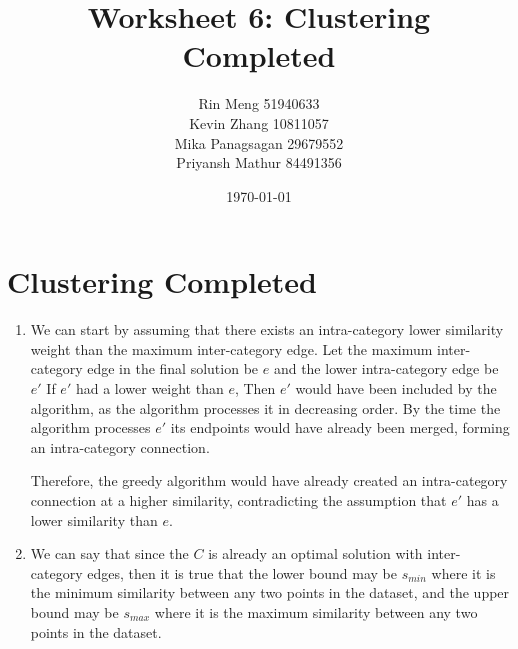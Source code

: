 \documentclass[12pt]{article}
\title{Worksheet 6: Clustering Completed}
\author{Rin Meng 51940633 \\ Kevin Zhang 10811057 \\ Mika Panagsagan 29679552 \\ Priyansh Mathur 84491356}
\date{\today}
\begin{document}
\maketitle

\section{Clustering Completed}

\begin{enumerate}
    \item We can start by assuming that there exists an intra-category
    lower similarity weight than the maximum inter-category edge. 
    Let the maximum inter-category edge in the final solution be $e$ 
    and the lower intra-category edge be $e \prime$
    If $e \prime$ had a lower weight than $e$,
    Then $e \prime$ would have been included by the algorithm, as 
    the algorithm processes it in decreasing order.
    By the time the algorithm processes $e \prime$ its endpoints would have already
    been merged, forming an intra-category connection.

    Therefore, the greedy algorithm would have already created an 
    intra-category connection at a higher similarity, 
    contradicting the assumption that $e \prime$ has a lower similarity than $e$.

    \item We can say that since the $C$ is already an optimal solution with inter-category
    edges, then it is true that the lower bound may be $s_{min}$ where it is the minimum
    similarity between any two points in the dataset, and the upper bound may be $s_{max}$ where
    it is the maximum similarity between any two points in the dataset.
\end{enumerate}
\end{document}
